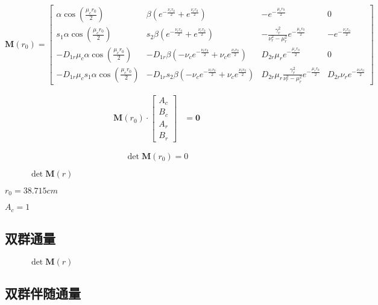 \begin{equation}
    \pmb{M}(r_0) = 
    \begin{bmatrix}
        \alpha\cos(\frac{\mu_c r_0}{2}) & \beta(e^{-\frac{\nu_c r_0}{2}}+e^{\frac{\nu_c r_0}{2}}) & -e^{-\frac{\mu_r r_0}{2}} & 0 \\
        s_1\alpha\cos(\frac{\mu_c r_0}{2}) & s_2\beta(e^{-\frac{\nu_c r_0}{2}}+e^{\frac{\nu_c r_0}{2}}) & -\frac{\gamma_r^2}{\nu_r^2 - \mu_r^2}e^{-\frac{\mu_r r_0}{2}} & -e^{-\frac{\nu_r r_0}{2}} \\
        -D_{1r}\mu_c\alpha\cos(\frac{\mu_c r_0}{2}) & -D_{1r}\beta(-\nu_c e^{-\frac{\nu_c r_0}{2}}+\nu_c e^{\frac{\nu_c r_0}{2}}) & D_{2r}\mu_r e^{-\frac{\mu_r r_0}{2}} & 0 \\
        -D_{1r}\mu_c s_1\alpha\cos(\frac{\mu_c r_0}{2}) & -D_{1r}s_2\beta(-\nu_c e^{-\frac{\nu_c r_0}{2}}+\nu_c e^{\frac{\nu_c r_0}{2}}) & D_{2r}\mu_r\frac{\gamma_r^2}{\nu_r^2 - \mu_r^2}e^{-\frac{\mu_r r_0}{2}} & D_{2r}\nu_r e^{-\frac{\nu_r r_0}{2}}
    \end{bmatrix}
\end{equation}

\begin{align}
    \pmb{M}(r_0) \cdot \begin{bmatrix}
        A_c \\
        B_c \\
        A_r \\
        B_r
    \end{bmatrix} &= \pmb{0}
\end{align}

\begin{equation}
    \det \pmb{M}(r_0) = 0
\end{equation}

\begin{figure}[H]
    \centering
    
    \caption{$\det \pmb{M}(r)$}
    \label{fig:det_M}
\end{figure}

$r_0=38.715\si{cm}$

$A_c=1$

\subsection{双群通量}

\begin{figure}[H]
    \centering
    
    \caption{$\det \pmb{M}(r)$}
    \label{fig:flux_r}
\end{figure}

\subsection{双群伴随通量}
